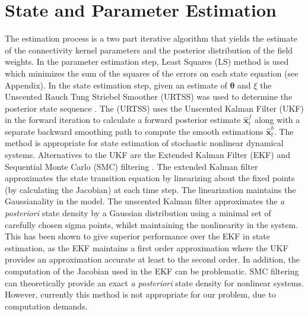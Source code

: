 \documentclass[12pt]{iopart}		%
\begin{document}
\section{State and Parameter Estimation}
The estimation process is a two part iterative algorithm that yields the estimate of the connectivity kernel parameters and the posterior distribution of the field weights. In the parameter estimation step, Least Squares (LS) method is used which minimizes the sum of the squares of the errors on each state equation (see Appendix). In the state estimation step, given an estimate of $\boldsymbol \theta$ and $\xi$ the Unscented Rauch Tung Striebel Smoother (URTSS) \cite{Sarkka2010} was used to determine the posterior state sequence .
The (URTSS) uses the Unscented Kalman Filter (UKF) in the forward iteration \cite{Julier1997} to calculate a forward posterior estimate $\hat{\mathbf x}_t^{f} $ along with a separate backward smoothing path to compute the smooth estimations $\hat{\mathbf x}_t^{b} $. The method is appropriate for state estimation of stochastic nonlinear dynamical systems. Alternatives to the UKF are the Extended Kalman Filter (EKF) \cite{Haykin2001}  and Sequential Monte Carlo (SMC) filtering \cite{doucet2001}. The extended Kalman filter approximates the state transition equation by linearizing about the fixed points (by calculating the Jacobian) at each time step. The linearization maintains the Gaussianality in the model. The unscented Kalman filter approximates the \emph{a posteriori} state density by a Gaussian distribution using a minimal set of carefully chosen sigma points, whilst maintaining the nonlinearity in the system. This has been shown to give superior performance over the EKF in state estimation, as the EKF maintains a first order approximation where the UKF provides an approximation accurate at least to the second order. In addition, the computation of the Jacobian used in the
EKF can be problematic. SMC filtering can theoretically provide an exact \emph{a posteriori} state density for nonlinear systems. However, currently this method is not appropriate for our problem, due to computation demands.
\end{document}

